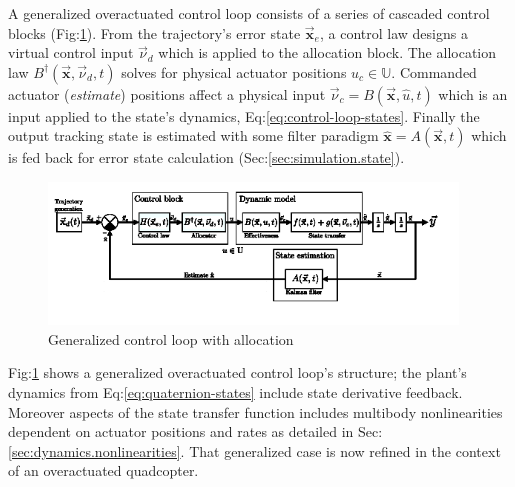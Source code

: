 \par
A generalized overactuated control loop consists of a series of cascaded control blocks (Fig:\ref{fig:control-loop}). From the trajectory's error state $\vec{\mathbf{x}}_e$, a control law designs a virtual control input $\vec{\nu}_d$ which is applied to the allocation block. The allocation law $B^{\dagger}(\vec{\mathbf{x}},\vec{\nu}_d,t)$ solves for physical actuator positions $u_c\in\mathbb{U}$. Commanded actuator (\emph{estimate}) positions affect a physical input $\vec{\nu}_c=B(\vec{\mathbf{x}},\hat{u},t)$ which is an input applied to the state's dynamics, Eq:\ref{eq:control-loop-states}. Finally the output tracking state is estimated with some filter paradigm $\hat{\mathbf{x}}=A(\vec{\mathbf{x}},t)$ which is fed back for error state calculation (Sec:\ref{sec:simulation.state}).
\begin{figure}[htbp]
\centering
\includegraphics[width=0.97\textwidth]{figs/control-loop}
\vspace{-28pt}
\caption{Generalized control loop with allocation}
\vspace{-16pt}
\label{fig:control-loop}
\end{figure}
\par
Fig:\ref{fig:control-loop} shows a generalized overactuated control loop's structure; the plant's dynamics from Eq:\ref{eq:quaternion-states} include state derivative feedback. Moreover aspects of the state transfer function includes multibody nonlinearities dependent on actuator positions and rates as detailed in Sec:\ref{sec:dynamics.nonlinearities}. That generalized case is now refined in the context of an overactuated quadcopter.
